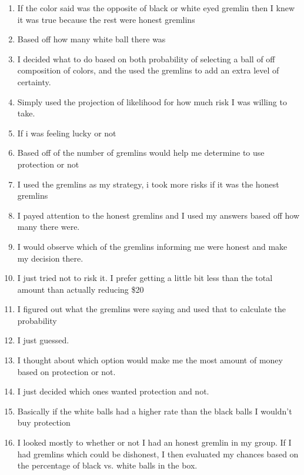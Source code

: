 \documentclass[12pt,a4paper]{article}
\begin{document}
\begin{enumerate}
\item If the color said was the opposite of black or white eyed gremlin then I knew it was true because the rest were honest gremlins

\item Based off how many white ball there was

\item I decided what to do based on both probability of selecting a ball of off composition of colors, and the used the gremlins to add an extra level of certainty.

\item Simply used the projection of likelihood for how much risk I was willing to take.

\item If i was feeling lucky or not

\item Based off of the number of gremlins would help me determine to use protection or not

\item I used the gremlins as my strategy, i took more risks if it was the honest gremlins

\item I payed attention to the honest gremlins and I used my answers based off how many there were.

\item I would observe which of the gremlins informing me were honest and make my decision there.

\item I just tried not to risk it. I prefer getting a little bit less than the total amount than actually reducing \$20

\item I figured out what the gremlins were saying and used that to calculate the probability

\item I just guessed.

\item I thought about which option would make me the most amount of money based on protection or not.

\item I just decided which ones wanted protection and not.

\item Basically if the white balls had a higher rate than the black balls I wouldn't buy protection

\item I looked mostly to whether or not I had an honest gremlin in my group. If I had gremlins which could be dishonest, I then evaluated my chances based on the percentage of black vs. white balls in the box.


\end{enumerate}
\end{document}
